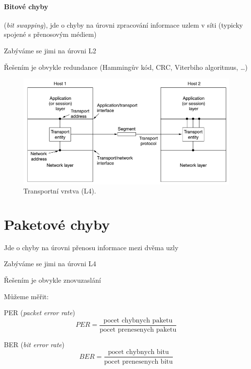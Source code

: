 \paragraph*{Bitové chyby} \begin{compactitem}
    \item {} (\textit{bit swapping}), jde o chyby na úrovni zpracování informace uzlem v síti (typicky spojené s přenosovým médiem)
    \item Zabýváme se jimi na úrovni L2
    \item Řešením je obvykle redundance (Hammingův kód, CRC, Viterbiho algoritmus, \dots)
\end{compactitem}

\begin{figure}[H]
    \centering
    \includegraphics[width=1\linewidth]{l4.png}
    \caption{Transportní vrstva (L4).}
\end{figure}


\section{Paketové chyby}

\begin{compactitem}
    \item Jde o chyby na úrovni přenosu informace mezi dvěma uzly
    \item Zabýváme se jimi na úrovni L4
    \item Řešením je obvykle znovuzaslání
    \item Můžeme měřit: \begin{compactitem}
        \item PER (\textit{packet error rate}) $$PER = \frac{\text{pocet chybnych paketu}}{\text{pocet prenesenych paketu}}$$
        \item BER (\textit{bit error rate}) $$BER = \frac{\text{pocet chybnych bitu}}{\text{pocet prenesenych bitu}}$$
    \end{compactitem}
\end{compactitem}

